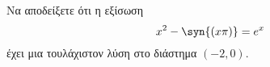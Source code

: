 Να αποδείξετε ότι η εξίσωση \[ x^2-\syn{(x\pi)}=e^x \] έχει μια τουλάχιστον λύση στο διάστημα $ (-2,0) $.
